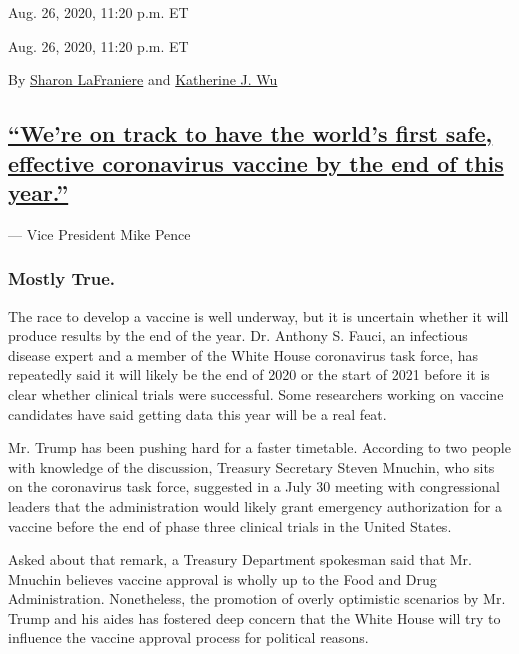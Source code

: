 Aug. 26, 2020, 11:20 p.m. ET

Aug. 26, 2020, 11:20 p.m. ET

By \href{https://www.nytimes3xbfgragh.onion/by/sharon-lafraniere}{Sharon
LaFraniere} and
\href{https://www.nytimes3xbfgragh.onion/by/katherine-j--wu}{Katherine
J. Wu}

\hypertarget{were-on-track-to-have-the-worlds-first-safe-effective-coronavirus-vaccine-by-the-end-of-this-year}{%
\subsection{\texorpdfstring{\protect\hyperlink{were-on-track-to-have-the-worlds-first-safe-effective-coronavirus-vaccine-by-the-end-of-this-year}{``We're
on track to have the world's first safe, effective coronavirus vaccine
by the end of this
year.''}}{``We're on track to have the world's first safe, effective coronavirus vaccine by the end of this year.''}}\label{were-on-track-to-have-the-worlds-first-safe-effective-coronavirus-vaccine-by-the-end-of-this-year}}

--- Vice President Mike Pence

\hypertarget{mostly-true}{%
\subsubsection{Mostly True.}\label{mostly-true}}

The race to develop a vaccine is well underway, but it is uncertain
whether it will produce results by the end of the year. Dr. Anthony S.
Fauci, an infectious disease expert and a member of the White House
coronavirus task force, has repeatedly said it will likely be the end of
2020 or the start of 2021 before it is clear whether clinical trials
were successful. Some researchers working on vaccine candidates have
said getting data this year will be a real feat.

Mr. Trump has been pushing hard for a faster timetable. According to two
people with knowledge of the discussion, Treasury Secretary Steven
Mnuchin, who sits on the coronavirus task force, suggested in a July 30
meeting with congressional leaders that the administration would likely
grant emergency authorization for a vaccine before the end of phase
three clinical trials in the United States.

Asked about that remark, a Treasury Department spokesman said that Mr.
Mnuchin believes vaccine approval is wholly up to the Food and Drug
Administration. Nonetheless, the promotion of overly optimistic
scenarios by Mr. Trump and his aides has fostered deep concern that the
White House will try to influence the vaccine approval process for
political reasons.

